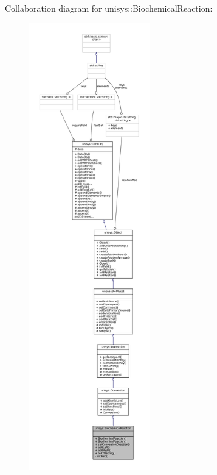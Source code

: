 Collaboration diagram for unisys\-:\-:Biochemical\-Reaction\-:
\nopagebreak
\begin{figure}[H]
\begin{center}
\leavevmode
\includegraphics[height=550pt]{classunisys_1_1BiochemicalReaction__coll__graph}
\end{center}
\end{figure}
